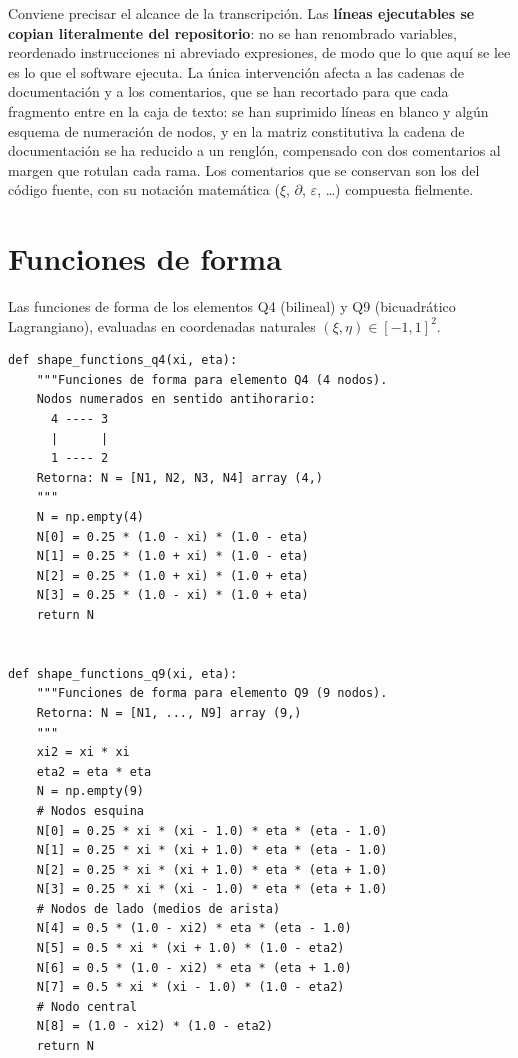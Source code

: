 Conviene precisar el alcance de la transcripción. Las \textbf{líneas ejecutables se copian literalmente del repositorio}: no se han renombrado variables, reordenado instrucciones ni abreviado expresiones, de modo que lo que aquí se lee es lo que el software ejecuta. La única intervención afecta a las cadenas de documentación y a los comentarios, que se han recortado para que cada fragmento entre en la caja de texto: se han suprimido líneas en blanco y algún esquema de numeración de nodos, y en la matriz constitutiva la cadena de documentación se ha reducido a un renglón, compensado con dos comentarios al margen que rotulan cada rama. Los comentarios que se conservan son los del código fuente, con su notación matemática ($\xi$, $\partial$, $\varepsilon$, \dots) compuesta fielmente.

\section{Funciones de forma}

Las funciones de forma de los elementos Q4 (bilineal) y Q9 (bicuadrático Lagrangiano), evaluadas en coordenadas naturales $(\xi,\eta) \in [-1,1]^2$.

\begin{lstlisting}
def shape_functions_q4(xi, eta):
    """Funciones de forma para elemento Q4 (4 nodos).
    Nodos numerados en sentido antihorario:
      4 ---- 3
      |      |
      1 ---- 2
    Retorna: N = [N1, N2, N3, N4] array (4,)
    """
    N = np.empty(4)
    N[0] = 0.25 * (1.0 - xi) * (1.0 - eta)
    N[1] = 0.25 * (1.0 + xi) * (1.0 - eta)
    N[2] = 0.25 * (1.0 + xi) * (1.0 + eta)
    N[3] = 0.25 * (1.0 - xi) * (1.0 + eta)
    return N


def shape_functions_q9(xi, eta):
    """Funciones de forma para elemento Q9 (9 nodos).
    Retorna: N = [N1, ..., N9] array (9,)
    """
    xi2 = xi * xi
    eta2 = eta * eta
    N = np.empty(9)
    # Nodos esquina
    N[0] = 0.25 * xi * (xi - 1.0) * eta * (eta - 1.0)
    N[1] = 0.25 * xi * (xi + 1.0) * eta * (eta - 1.0)
    N[2] = 0.25 * xi * (xi + 1.0) * eta * (eta + 1.0)
    N[3] = 0.25 * xi * (xi - 1.0) * eta * (eta + 1.0)
    # Nodos de lado (medios de arista)
    N[4] = 0.5 * (1.0 - xi2) * eta * (eta - 1.0)
    N[5] = 0.5 * xi * (xi + 1.0) * (1.0 - eta2)
    N[6] = 0.5 * (1.0 - xi2) * eta * (eta + 1.0)
    N[7] = 0.5 * xi * (xi - 1.0) * (1.0 - eta2)
    # Nodo central
    N[8] = (1.0 - xi2) * (1.0 - eta2)
    return N
\end{lstlisting}

